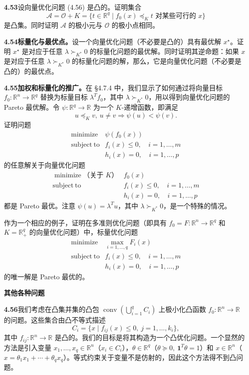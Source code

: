 \documentclass[UTF8, 12pt, fontset=fandol, oneside]{ctexart}
\begin{document}
\noindent\textbf{4.53}\quad 设向量优化问题 (4.56) 是凸的。证明集合
\[
\mathcal{A}=\mathcal{O}+K=\{t\in\mathbb{R}^q\mid f_0(x)\preceq_K t\text{ 对某些可行的 }x\}
\]
是凸集。同时证明 $\mathcal{A}$ 的极小元与 $\mathcal{O}$ 的极小点相同。

\noindent\textbf{4.54\quad 标量化与最优点。}\quad 设一个向量优化问题（不必要是凸的）具有最优解 $x^\star$。证明 $x^\star$ 是对应于任意 $\lambda\succ_{K^\ast}0$ 的标量化问题的最优解。同时证明其逆命题：如果 $x$ 是对应于任意 $\lambda\succ_{K^\ast}0$ 的标量化问题的解，那么，它是向量优化问题（不必要是凸的）的最优点。

\noindent\textbf{4.55\quad 加权和标量化的推广。}\quad 在 \S4.7.4 中，我们显示了如何通过将向量目标 $f_0:\mathbb{R}^n\to\mathbb{R}^q$ 替换为标量目标 $\lambda^Tf_0$，其中 $\lambda\succ_{K^\ast}0$，用以得到向量优化问题的 Pareto 最优解。令 $\psi:\mathbb{R}^q\to\mathbb{R}$ 为一个 $K$-递增函数，即满足
\[
u\preceq_K v,\ u\neq v\Longrightarrow \psi(u)<\psi(v).
\]
证明问题
\[
\begin{array}{ll}
\mathop{\mathrm{minimize}} & \psi(f_0(x))\\
\mathrm{subject\ to} & f_i(x)\leq0,\quad i=1,\ldots,m\\
& h_i(x)=0,\quad i=1,\ldots,p
\end{array}
\]
的任意解关于向量优化问题
\[
\begin{array}{ll}
\mathop{\mathrm{minimize}}\text{（关于 }K\text{）} & f_0(x)\\
\mathrm{subject\ to} & f_i(x)\leq0,\quad i=1,\ldots,m\\
& h_i(x)=0,\quad i=1,\ldots,p
\end{array}
\]
都是 Pareto 最优。注意 $\psi(u)=\lambda^Tu$，其中 $\lambda\succ_{K^\ast}0$，是一个特殊的情况。

作为一个相应的例子，证明在多准则优化问题（即具有 $f_0=F:\mathbb{R}^n\to\mathbb{R}^q$ 和 $K=\mathbb{R}_+^q$ 的向量优化问题）中，标量优化问题
\[
\begin{array}{ll}
\mathop{\mathrm{minimize}} & \max_{i=1,\ldots,q}F_i(x)\\
\mathrm{subject\ to} & f_i(x)\leq0,\quad i=1,\ldots,m\\
& h_i(x)=0,\quad i=1,\ldots,p
\end{array}
\]
的唯一解是 Pareto 最优的。

\noindent\textbf{其他各种问题}

\noindent\textbf{4.56\quad [P. Parrilo]}\quad 我们考虑在凸集并集的凸包 $\operatorname{conv}(\bigcup_{i=1}^q C_i)$ 上极小化凸函数 $f_0:\mathbb{R}^n\to\mathbb{R}$ 的问题。这些集合由凸不等式描述
\[
C_i=\{x\mid f_{ij}(x)\leq0,\ j=1,\ldots,k_i\},
\]
其中 $f_{ij}:\mathbb{R}^n\to\mathbb{R}$ 是凸的。我们的目标是将其构造为一个凸优化问题。一个显然的方法是引入变量 $x_1,\ldots,x_q\in\mathbb{R}^n$（$x_i\in C_i$），$\theta\in\mathbb{R}^q$（$\theta\succeq0,\ \mathbf{1}^T\theta=1$）和 $x\in\mathbb{R}^n$（$x=\theta_1x_1+\cdots+\theta_qx_q$）。等式约束关于变量不是仿射的，因此这个方法得不到凸问题。
\end{document}
